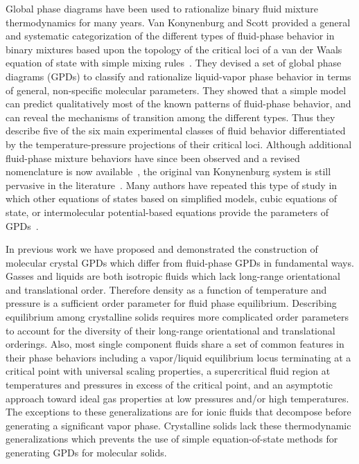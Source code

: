 \documentclass[preprint]{iucr}              %
\begin{document}
Global phase diagrams have been used to rationalize binary fluid mixture thermodynamics for many years.  Van Konynenburg and Scott provided a general and systematic categorization of the different types of fluid-phase behavior in binary mixtures based upon the topology of the critical loci of a van der Waals equation of state with simple mixing rules~\cite{vanKonynenburg80}.  They devised a set of global phase diagrams (GPDs) to classify and rationalize liquid-vapor phase behavior in terms of general, non-specific molecular parameters.  They showed that a simple model can predict qualitatively most of the known patterns of fluid-phase behavior, and can reveal the mechanisms of transition among the different types.  Thus they describe five of the six main experimental classes of fluid behavior differentiated by the temperature-pressure projections of their critical loci.  Although additional fluid-phase mixture behaviors have since been observed and a revised nomenclature is now available~\cite{Bolz98}, the original van Konynenburg system is still pervasive in the literature~\cite{AparicioMartinez07a,AparicioMartinez07b,Cismondi07}. Many authors have repeated this type of study in which other equations of states based on simplified models, cubic equations of state, or intermolecular potential-based equations provide the parameters of GPDs~\cite{Polishuk00,Polishuk02,vanPelt95}.
 
In previous work we have proposed and demonstrated the construction of molecular crystal GPDs which differ from fluid-phase GPDs in fundamental ways.  Gasses and liquids are both isotropic fluids which lack long-range orientational and translational order.  Therefore density as a function of temperature and pressure is a sufficient order parameter for fluid phase equilibrium.  Describing equilibrium among crystalline solids requires more complicated order parameters to account for the diversity of their long-range orientational and translational orderings.  Also, most single component fluids share a set of common features in their phase behaviors including a vapor/liquid equilibrium locus terminating at a critical point with universal scaling properties, a supercritical fluid region at temperatures and pressures in excess of the critical point, and an asymptotic approach toward ideal gas properties at low pressures and/or high temperatures.  The exceptions to these generalizations are for ionic fluids that decompose before generating a significant vapor phase.  Crystalline solids lack these thermodynamic generalizations which prevents the use of simple equation-of-state methods for generating GPDs for molecular solids.
\end{document}
